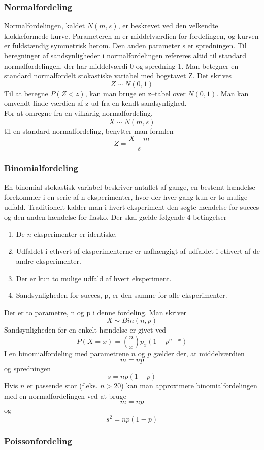 \documentclass[11pt]{article}
\begin{document}
\subsubsection{Normalfordeling}
Normalfordelingen, kaldet $N(m,s)$, er beskrevet ved den velkendte klokkeformede kurve. Parameteren m er middelværdien for fordelingen, og  kurven er fuldstændig symmetrisk herom. Den anden parameter s er spredningen. Til beregninger af sandsynligheder i normalfordelingen refereres altid til standard normalfordelingen, der har middelværdi 0 og spredning 1. Man betegner en standard normalfordelt stokastiske variabel med bogstavet Z. Det skrives 
$$Z\sim N(0,1)$$
Til at beregne $P(Z<z)$, kan man bruge en z--tabel over $N(0,1)$. Man kan omvendt finde værdien af z ud fra en kendt sandsynlighed.\\[0.2cm]
For at omregne fra en vilkårlig normalfordeling,
$$X \sim N(m, s)$$
til en standard normalfordeling, benytter man formlen
$$Z=\frac{X-m}{s}$$

\subsubsection{Binomialfordeling}
En binomial stokastisk variabel beskriver antallet af gange, en bestemt hændelse forekommer i en serie af n eksperimenter, hvor der hver gang kun er to mulige udfald. Traditionelt kalder man i hvert eksperiment den søgte hændelse for succes og den anden hændelse for fiasko. Der skal gælde følgende 4 betingelser
\begin{enumerate}\itemsep-2pt
\item De $n$ eksperimenter er identiske.
\item Udfaldet i ethvert af eksperimenterne er uafhængigt af udfaldet i ethvert af de andre eksperimenter.
\item Der er kun to mulige udfald af hvert eksperiment.
\item Sandsynligheden for succes, p, er den samme for alle eksperimenter.
\end{enumerate}
Der er to parametre, n og p i denne fordeling. Man skriver
$$X\sim Bin(n,p)$$
Sandsynligheden for en enkelt hændelse er givet ved 
$$P(X=x)=\left( \frac{n}{x}\right)p_x(1-p^{n-x})$$
I en binomialfordeling med parametrene $n$ og $p$ gælder der, at middelværdien 
$$m=np$$
og spredningen 
$$s = np(1-p)$$
Hvis $n$ er passende stor (f.eks. $n>20$) kan man approximere binomialfordelingen med en normalfordelingen ved at bruge 
$$m = np$$
og
$$s^2 = np(1-p)$$ 
\subsubsection{Poissonfordeling}
\end{document}
